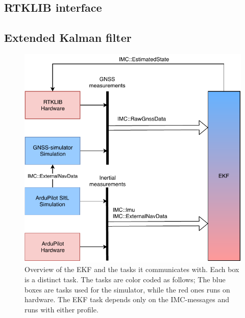 \subsection{RTKLIB interface}

\subsection{Extended Kalman filter}
    
\begin{figure}
    \centering
    \includegraphics[scale=0.8]{Implementation/Images/dune-tasks.pdf}
    \caption{Overview of the EKF and the tasks it communicates with. Each box is a distinct task. The tasks are color coded as follows; The blue boxes are tasks used for the simulator, while the red ones runs on hardware. The EKF task depends only on the IMC-messages and runs with either profile.}
    \label{fig:dune-tasks}
\end{figure}